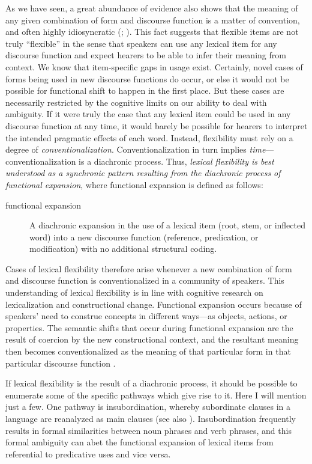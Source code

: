 As we have seen, a great abundance of evidence also shows that the meaning of any given combination of form and discourse function is a matter of convention, and often highly idiosyncratic (; ). This fact suggests that flexible items are not truly \enquote{flexible} in the sense that speakers can use any lexical item for any discourse function and expect hearers to be able to infer their meaning from context. We know that item-specific gaps in usage exist. Certainly, novel cases of forms being used in new discourse functions do occur, or else it would not be possible for functional shift to happen in the first place. But these cases are necessarily restricted by the cognitive limits on our ability to deal with ambiguity. If it were truly the case that any lexical item could be used in any discourse function at any time, it would barely be possible for hearers to interpret the intended pragmatic effects of each word. Instead, flexibility must rely on a degree of \emph{conventionalization}. Conventionalization in turn implies \emph{time}—conventionalization is a diachronic process. Thus, \emph{lexical flexibility is best understood as a synchronic pattern resulting from the diachronic process of functional expansion}, where functional expansion is defined as follows:

\begin{description}
  \item[functional expansion] A diachronic expansion in the use of a lexical item (root, stem, or inflected word) into a new discourse function (reference, predication, or modification) with no additional structural coding.
\end{description}

\noindent Cases of lexical flexibility therefore arise whenever a new combination of form and discourse function is conventionalized in a community of speakers. This understanding of lexical flexibility is in line with cognitive research on lexicalization and constructional change. Functional expansion occurs because of speakers' need to construe concepts in different ways—as objects, actions, or properties. The semantic shifts that occur during functional expansion are the result of coercion by the new constructional context, and the resultant meaning then becomes conventionalized as the meaning of that particular form in that particular discourse function \parencite[108]{Croft1991}.

If lexical flexibility is the result of a diachronic process, it should be possible to enumerate some of the specific pathways which give rise to it. Here I will mention just a few. One pathway is insubordination, whereby subordinate clauses in a language are reanalyzed as main clauses \parencites{Evans2007}{Mithun2008}{EvansWatanabe2016} (see also ). Insubordination frequently results in formal similarities between noun phrases and verb phrases, and this formal ambiguity can abet the functional expansion of lexical items from referential to predicative uses and vice versa.


